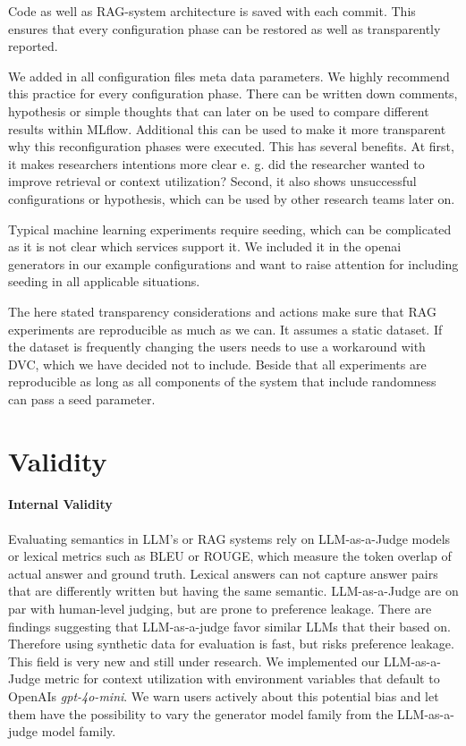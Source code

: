 Code as well as RAG-system architecture is saved with each commit. This ensures that every configuration phase can be restored as well as transparently reported. 

We added in all configuration files meta data parameters. We highly recommend this practice for every configuration phase. There can be written down comments, hypothesis or simple thoughts that can later on be used to compare different results within MLflow. Additional this can be used to make it more transparent why this reconfiguration phases were executed. This has several benefits.
At first, it makes researchers intentions more clear e. g. did the researcher wanted to improve retrieval or context utilization? 
Second, it also shows unsuccessful configurations or hypothesis, which can be used by other research teams later on.

Typical machine learning experiments require seeding, which can be complicated as it is not clear which services support it. We included it in the openai generators in our example configurations and want to raise attention for including seeding in all applicable situations.

The here stated transparency considerations and actions make sure that RAG experiments are reproducible as much as we can. It assumes a static dataset. If the dataset is frequently changing the users needs to use a workaround with DVC, which we have decided not to include.
Beside that all experiments are reproducible as long as all components of the system that include randomness can pass a seed parameter.

\section{Validity}

\paragraph{Internal Validity}
Evaluating semantics in LLM's or RAG systems rely on LLM-as-a-Judge models or lexical metrics such as BLEU or ROUGE, which measure the token overlap of actual answer and ground truth. Lexical answers can not capture answer pairs that are differently written but having the same semantic. LLM-as-a-Judge are on par with human-level judging, but are prone to preference leakage. There are findings suggesting that LLM-as-a-judge favor similar LLMs that their based on. Therefore using synthetic data for evaluation is fast, but risks preference leakage.\cite{Li.03.02.2025} This field is very new and still under research. We implemented our LLM-as-a-Judge metric for context utilization with environment variables that default to OpenAIs \textit{gpt-4o-mini}\cite{OpenAI_2022}. We warn users actively about this potential bias and let them have the possibility to vary the generator model family from the LLM-as-a-judge model family.

